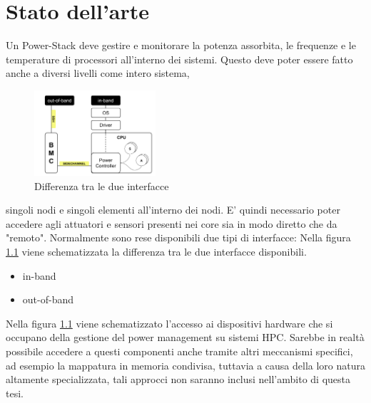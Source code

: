 
\chapter{Stato dell'arte}
Un Power-Stack deve gestire e monitorare la potenza assorbita, le frequenze e le temperature di processori all'interno dei sistemi. Questo deve poter essere fatto anche a diversi livelli come intero sistema,
\setlength{\intextsep}{1pt} %
\begin{figure}
    \includegraphics[width=0.4\textwidth]{img/SoA.png}
    \centering
    \caption{Differenza tra le due interfacce} 
    \label{fig:SoAinoutband}
\end{figure}
singoli nodi e singoli elementi all'interno dei nodi. E' quindi necessario poter accedere agli attuatori e sensori presenti nei core sia in modo diretto che da "remoto". Normalmente sono rese disponibili due tipi di interfacce:
Nella figura \ref{fig:SoAinoutband} viene schematizzata la differenza tra le due interfacce disponibili. 
\begin{itemize}
    \item in-band
    \item out-of-band
\end{itemize}
Nella figura \ref{fig:SoAinoutband} viene schematizzato l'accesso ai dispositivi hardware che si occupano della gestione del power management su sistemi HPC. Sarebbe in realtà possibile accedere a questi componenti anche tramite altri meccanismi specifici, ad esempio la mappatura in memoria condivisa, tuttavia a causa della loro natura altamente specializzata, tali approcci non saranno inclusi nell'ambito di questa tesi.


